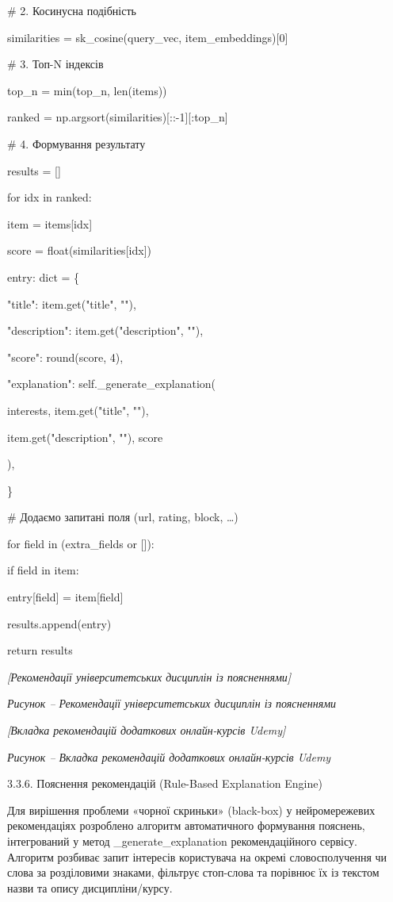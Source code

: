 \documentclass[
]{article}
\begin{document}
\# 2. Косинусна подібність

similarities = sk\_cosine(query\_vec, item\_embeddings){[}0{]}

\# 3. Топ-N індексів

top\_n = min(top\_n, len(items))

ranked = np.argsort(similarities){[}::-1{]}{[}:top\_n{]}

\# 4. Формування результату

results = {[}{]}

for idx in ranked:

item = items{[}idx{]}

score = float(similarities{[}idx{]})

entry: dict = \{

"title": item.get("title", ""),

"description": item.get("description", ""),

"score": round(score, 4),

"explanation": self.\_generate\_explanation(

interests, item.get("title", ""),

item.get("description", ""), score

),

\}

\# Додаємо запитані поля (url, rating, block, \ldots)

for field in (extra\_fields or {[}{]}):

if field in item:

entry{[}field{]} = item{[}field{]}

results.append(entry)

return results

\emph{{[}Рекомендації університетських дисциплін із поясненнями{]}}

\emph{Рисунок -- Рекомендації університетських дисциплін із поясненнями}

\emph{{[}Вкладка рекомендацій додаткових онлайн-курсів Udemy{]}}

\emph{Рисунок -- Вкладка рекомендацій додаткових онлайн-курсів Udemy}

3.3.6. Пояснення рекомендацій (Rule-Based Explanation Engine)

Для вирішення проблеми «чорної скриньки» (black-box) у нейромережевих
рекомендаціях розроблено алгоритм автоматичного формування пояснень,
інтегрований у метод \_generate\_explanation рекомендаційного сервісу.
Алгоритм розбиває запит інтересів користувача на окремі словосполучення
чи слова за розділовими знаками, фільтрує стоп-слова та порівнює їх із
текстом назви та опису дисципліни/курсу.
\end{document}
